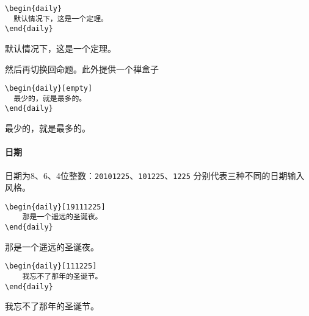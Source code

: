 \documentclass{SYSUDaily}
\begin{document}
\begin{multicols}{2}
	\begin{lstlisting}
\begin{daily}
  默认情况下，这是一个定理。
\end{daily}
\end{lstlisting}
	\small
	\begin{daily}
		默认情况下，这是一个定理。
	\end{daily}
\end{multicols}
然后再切换回命题。此外提供一个禅盒子
\begin{multicols}{2}
	\begin{lstlisting}
\begin{daily}[empty]
  最少的，就是最多的。
\end{daily}
\end{lstlisting}
	\small
	\begin{daily}[empty]
		最少的，就是最多的。
	\end{daily}
\end{multicols}

\paragraph{日期}
日期为8、6、4位整数：\verb|20101225|、\verb|101225|、\verb|1225| 分别代表三种不同的日期输入风格。

\begin{multicols}{2}
	\begin{lstlisting}
\begin{daily}[19111225]
	那是一个遥远的圣诞夜。
\end{daily}
  \end{lstlisting}
	\small
	\begin{daily}[19111225]
		那是一个遥远的圣诞夜。
	\end{daily}
\end{multicols}


\begin{multicols}{2}
	\begin{lstlisting}
\begin{daily}[111225]
	我忘不了那年的圣诞节。
\end{daily}
  \end{lstlisting}
	\small
	\begin{daily}[111225]
		我忘不了那年的圣诞节。
	\end{daily}
\end{multicols}
\end{document}
